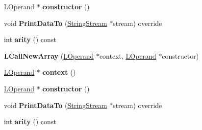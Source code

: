 \begin{DoxyCompactItemize}
\item 
\hyperlink{classv8_1_1internal_1_1_l_operand}{L\+Operand} $\ast$ {\bfseries constructor} ()\hypertarget{classv8_1_1internal_1_1_l_call_new_array_aeda3b4ff8fafcf3f7b24bd8e3f64bbea}{}\label{classv8_1_1internal_1_1_l_call_new_array_aeda3b4ff8fafcf3f7b24bd8e3f64bbea}

\item 
void {\bfseries Print\+Data\+To} (\hyperlink{classv8_1_1internal_1_1_string_stream}{String\+Stream} $\ast$stream) override\hypertarget{classv8_1_1internal_1_1_l_call_new_array_add922262b764ca49467bb7797c8ee6ee}{}\label{classv8_1_1internal_1_1_l_call_new_array_add922262b764ca49467bb7797c8ee6ee}

\item 
int {\bfseries arity} () const \hypertarget{classv8_1_1internal_1_1_l_call_new_array_a82f7b48744a6d59495dd9bd36f91d611}{}\label{classv8_1_1internal_1_1_l_call_new_array_a82f7b48744a6d59495dd9bd36f91d611}

\item 
{\bfseries L\+Call\+New\+Array} (\hyperlink{classv8_1_1internal_1_1_l_operand}{L\+Operand} $\ast$context, \hyperlink{classv8_1_1internal_1_1_l_operand}{L\+Operand} $\ast$constructor)\hypertarget{classv8_1_1internal_1_1_l_call_new_array_a4bd46fe318f41b8ad3d446686db3e0de}{}\label{classv8_1_1internal_1_1_l_call_new_array_a4bd46fe318f41b8ad3d446686db3e0de}

\item 
\hyperlink{classv8_1_1internal_1_1_l_operand}{L\+Operand} $\ast$ {\bfseries context} ()\hypertarget{classv8_1_1internal_1_1_l_call_new_array_a7f1e1801fd731a8fbecc43a2cbf2140c}{}\label{classv8_1_1internal_1_1_l_call_new_array_a7f1e1801fd731a8fbecc43a2cbf2140c}

\item 
\hyperlink{classv8_1_1internal_1_1_l_operand}{L\+Operand} $\ast$ {\bfseries constructor} ()\hypertarget{classv8_1_1internal_1_1_l_call_new_array_aeda3b4ff8fafcf3f7b24bd8e3f64bbea}{}\label{classv8_1_1internal_1_1_l_call_new_array_aeda3b4ff8fafcf3f7b24bd8e3f64bbea}

\item 
void {\bfseries Print\+Data\+To} (\hyperlink{classv8_1_1internal_1_1_string_stream}{String\+Stream} $\ast$stream) override\hypertarget{classv8_1_1internal_1_1_l_call_new_array_add922262b764ca49467bb7797c8ee6ee}{}\label{classv8_1_1internal_1_1_l_call_new_array_add922262b764ca49467bb7797c8ee6ee}

\item 
int {\bfseries arity} () const \hypertarget{classv8_1_1internal_1_1_l_call_new_array_a82f7b48744a6d59495dd9bd36f91d611}{}\label{classv8_1_1internal_1_1_l_call_new_array_a82f7b48744a6d59495dd9bd36f91d611}

\end{DoxyCompactItemize}
